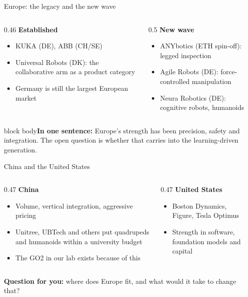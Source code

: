 \documentclass[aspectratio=169]{beamer}
\newcommand{\takeaway}[1]{\vspace{2mm}\begin{beamercolorbox}[rounded=true,sep=4pt,wd=\textwidth]{block body}\footnotesize\textbf{In one sentence:} #1\end{beamercolorbox}}
\begin{document}
\begin{frame}{Europe: the legacy and the new wave}
	\begin{columns}[T]
		\begin{column}{0.46\textwidth}
			\textbf{Established}
			\begin{itemize}\footnotesize
				\item KUKA (DE), ABB (CH/SE)
				\item Universal Robots (DK): the collaborative arm as a product category
				\item Germany is still the largest European market
			\end{itemize}
		\end{column}
		\begin{column}{0.5\textwidth}
			\textbf{New wave}
			\begin{itemize}\footnotesize
				\item ANYbotics (ETH spin-off): legged inspection
				\item Agile Robots (DE): force-controlled manipulation
				\item Neura Robotics (DE): cognitive robots, humanoids
			\end{itemize}
		\end{column}
	\end{columns}
	\takeaway{Europe's strength has been precision, safety and integration. The open question is whether that carries into the learning-driven generation.}
\end{frame}

\begin{frame}{China and the United States}
	\begin{columns}[T]
		\begin{column}{0.47\textwidth}
			\textbf{China}
			\begin{itemize}\footnotesize
				\item Volume, vertical integration, aggressive pricing
				\item Unitree, UBTech and others put quadrupeds and humanoids within a university budget
				\item The GO2 in our lab exists because of this
			\end{itemize}
		\end{column}
		\begin{column}{0.47\textwidth}
			\textbf{United States}
			\begin{itemize}\footnotesize
				\item Boston Dynamics, Figure, Tesla Optimus
				\item Strength in software, foundation models and capital
			\end{itemize}
		\end{column}
	\end{columns}
	\vspace{3mm}
	\centering \textbf{Question for you:} where does Europe fit, and what would it take to change that?
\end{frame}
\end{document}

